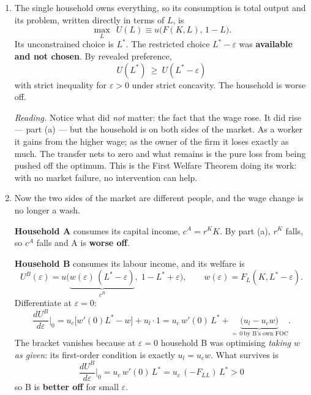 \documentclass[12pt, letterpaper]{article}
\newcommand{\dd}[2]{\dfrac{d #1}{d #2}}
\newcommand{\stst}{^{\ast}}
\begin{document}
\begin{tcolorbox}[evenbox,title={Problem 9.4 \quad Pro-Worker Policies}]
\begin{enumerate}
\item The single household owns everything, so its consumption is total output and its problem,
written directly in terms of $L$, is
\[
\max_{L}\ \ U(L)\equiv u\big(F(K,L),\,1-L\big).
\]
Its unconstrained choice is $L\stst$. The restricted choice $L\stst-\varepsilon$ was
\textbf{available and not chosen}. By revealed preference,
\[
U(L\stst)\ \ge\ U(L\stst-\varepsilon)
\]
with strict inequality for $\varepsilon>0$ under strict concavity. The household is worse off.
\checkmark

\emph{Reading.} Notice what did \emph{not} matter: the fact that the wage rose. It did rise ---
part (a) --- but the household is on both sides of the market. As a worker it gains from the
higher wage; as the owner of the firm it loses exactly as much. The transfer nets to zero and
what remains is the pure loss from being pushed off the optimum. This is the First Welfare
Theorem doing its work: with no market failure, no intervention can help.

\item Now the two sides of the market are different people, and the wage change is no longer a
wash.

\smallskip
\textbf{Household A} consumes its capital income, $c^A=r^KK$. By part (a), $r^K$ falls, so
$c^A$ falls and A is \textbf{worse off}. \checkmark

\smallskip
\textbf{Household B} consumes its labour income, and its welfare is
\[
U^B(\varepsilon)=u\Big(\underbrace{w(\varepsilon)\,(L\stst-\varepsilon)}_{c^B},\;
1-L\stst+\varepsilon\Big),
\qquad w(\varepsilon)=F_L(K,L\stst-\varepsilon).
\]
Differentiate at $\varepsilon=0$:
\[
\dd{U^B}{\varepsilon}\bigg|_{0}
=u_c\Big[w'(0)L\stst-w\Big]+u_l\cdot 1
=u_c\,w'(0)\,L\stst+\underbrace{\big(u_l-u_c w\big)}_{=\,0\ \text{by B's own FOC}} .
\]
The bracket vanishes because at $\varepsilon=0$ household B was optimising \emph{taking $w$ as
given}: its first-order condition is exactly $u_l=u_c w$. What survives is
\[
\boxed{\ \dd{U^B}{\varepsilon}\bigg|_{0}=u_c\,w'(0)\,L\stst
=u_c\,(-F_{LL})\,L\stst>0\ }
\]
so B is \textbf{better off} for small $\varepsilon$. \checkmark
\end{enumerate}


\end{tcolorbox}
\end{document}
